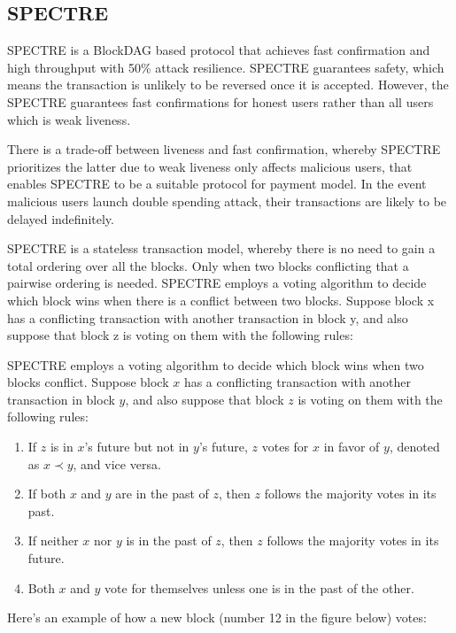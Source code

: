 \documentclass[a4paper,11pt]{article}
\begin{document}
\subsection{SPECTRE}
SPECTRE\cite{SPECTRE} is a BlockDAG based protocol that achieves fast confirmation and high throughput with 50\% attack resilience. SPECTRE guarantees safety, which means the transaction is unlikely to be reversed once it is accepted. However, the SPECTRE guarantees fast confirmations for honest users rather than all users which is weak liveness.

There is a trade-off between liveness and fast confirmation, whereby SPECTRE prioritizes the latter due to weak liveness only affects malicious users, that enables SPECTRE to be a suitable protocol for payment model. In the event malicious users launch double spending attack, their transactions are likely to be delayed indefinitely.

SPECTRE is a stateless transaction model, whereby there is no need to gain a total ordering over all the blocks. Only when two blocks conflicting that a pairwise ordering is needed. SPECTRE employs a voting algorithm to decide which block wins when there is a conflict between two blocks. Suppose block x has a conflicting transaction with another transaction in block y, and also suppose that block z is voting on them with the following rules:

SPECTRE employs a voting algorithm to decide which block wins when two blocks
conflict. Suppose block $x$ has a conflicting transaction with another
transaction in block $y$, and also suppose that block $z$ is voting on them with
the following rules:

\begin{enumerate}
	\item If $z$ is in $x$'s future but not in $y$'s future, $z$ votes for
		$x$ in favor of $y$, denoted as $x \prec y$, and vice versa.
	\item If both $x$ and $y$ are in the past of $z$, then $z$ follows the majority votes in its past.
	\item If neither $x$ nor $y$ is in the past of $z$, then $z$ follows the majority votes in its future.
	\item Both $x$ and $y$ vote for themselves unless one is in the past of
		the other.
\end{enumerate}


Here's an example of how a new block (number 12 in the figure below) votes:
\end{document}
